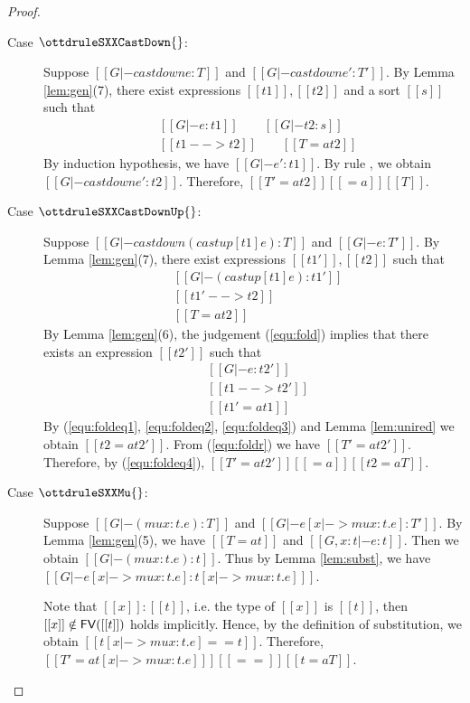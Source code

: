 \begin{proof}
\begin{description}
        \item[Case $\ottdruleSXXCastDown{}$:] $\quad$ \\
        Suppose $[[G |- castdown e :T]]$ and $[[G |- castdown e' :T']]$. By Lemma \ref{lem:gen}(7), there exist expressions $[[t1]], [[t2]]$ and a sort $[[s]]$ such that 
        \begin{align*}
            &[[G |- e:t1]] \qquad [[G |- t2:s]] \\
            &[[t1 --> t2]] \qquad [[T =a t2 ]]
        \end{align*}
        By induction hypothesis, we have $[[G |- e':t1]]$. By rule , we obtain $[[G |- castdown e' : t2 ]]$. Therefore, $[[T' =a t2]] [[=a]] [[T]]$.
        
        \item[Case $\ottdruleSXXCastDownUp{}$:] $\quad$ \\
        Suppose $[[G |- castdown (castup [t1] e) :T]]$ and $[[G |- e :T']]$. By Lemma \ref{lem:gen}(7), there exist expressions $[[t1']], [[t2]]$ such that 
        \begin{align}
            &[[G |- (castup [t1] e):t1']] \label{equ:fold} \\
            &[[t1' --> t2]] \label{equ:foldeq1} \\
            &[[T =a t2 ]] \label{equ:foldeq4}
        \end{align}
        By Lemma \ref{lem:gen}(6), the judgement (\ref{equ:fold}) implies that there exists an expression $[[t2']]$ such that
        \begin{align}
            &[[G |- e:t2']] \label{equ:foldr} \\
            &[[t1 --> t2']] \label{equ:foldeq2} \\
            &[[t1' =a t1]] \label{equ:foldeq3}
        \end{align}
        By (\ref{equ:foldeq1}, \ref{equ:foldeq2}, \ref{equ:foldeq3}) and Lemma \ref{lem:unired} we obtain $[[t2 =a t2']]$. From (\ref{equ:foldr}) we have $[[T' =a t2' ]]$. Therefore, by (\ref{equ:foldeq4}), $[[T' =a t2' ]] [[=a]] [[t2 =a T]]$.
        
        \item[Case $\ottdruleSXXMu{}$:] $\quad$ \\
        Suppose $[[G |- (mu x:t.e) :T]]$ and $[[G |- e[x |-> mu x:t.e] :T']]$. By Lemma \ref{lem:gen}(5), we have $[[T =a t]]$ and $[[G, x:t |- e:t]]$. Then we obtain $[[G |- (mu x:t.e) : t]]$. Thus by Lemma \ref{lem:subst}, we have $[[G |- e[x |-> mu x:t.e] : t[x |-> mu x:t.e] ]]$.
        
        Note that $[[x]]:[[t]]$, i.e. the type of $[[x]]$ is $[[t]]$, then $[[x]] \notin \mathsf{FV}([[t]])$ holds implicitly. Hence, by the definition of substitution, we obtain $[[t[x |-> mu x:t.e] == t]]$. Therefore, $[[T' =a t[x |-> mu x:t.e] ]] [[==]] [[t =a T]]$.
    \end{description}
\end{proof}

